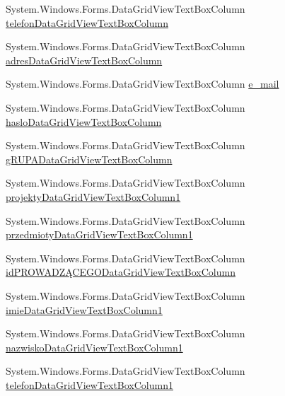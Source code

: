 \begin{DoxyCompactItemize}
\item 
System.\+Windows.\+Forms.\+Data\+Grid\+View\+Text\+Box\+Column \hyperlink{class_dziennik_ocen_1_1_form_admin_a72a251b150573a626647791876332015}{telefon\+Data\+Grid\+View\+Text\+Box\+Column}
\item 
System.\+Windows.\+Forms.\+Data\+Grid\+View\+Text\+Box\+Column \hyperlink{class_dziennik_ocen_1_1_form_admin_a06a64f75c8ce9a7c86ffdc6120741268}{adres\+Data\+Grid\+View\+Text\+Box\+Column}
\item 
System.\+Windows.\+Forms.\+Data\+Grid\+View\+Text\+Box\+Column \hyperlink{class_dziennik_ocen_1_1_form_admin_aaa3365a57ff352db1b165745e6631cb1}{e\+\_\+mail}
\item 
System.\+Windows.\+Forms.\+Data\+Grid\+View\+Text\+Box\+Column \hyperlink{class_dziennik_ocen_1_1_form_admin_a013f9ee1a23f86778e6c66155b1bf93e}{haslo\+Data\+Grid\+View\+Text\+Box\+Column}
\item 
System.\+Windows.\+Forms.\+Data\+Grid\+View\+Text\+Box\+Column \hyperlink{class_dziennik_ocen_1_1_form_admin_a6fc44af8dd2ad779199a11f1a2a3769d}{g\+R\+U\+P\+A\+Data\+Grid\+View\+Text\+Box\+Column}
\item 
System.\+Windows.\+Forms.\+Data\+Grid\+View\+Text\+Box\+Column \hyperlink{class_dziennik_ocen_1_1_form_admin_ac4aa25c3b282b8c8380d768559c95423}{projekty\+Data\+Grid\+View\+Text\+Box\+Column1}
\item 
System.\+Windows.\+Forms.\+Data\+Grid\+View\+Text\+Box\+Column \hyperlink{class_dziennik_ocen_1_1_form_admin_a227b182179159f912355b73406334336}{przedmioty\+Data\+Grid\+View\+Text\+Box\+Column1}
\item 
System.\+Windows.\+Forms.\+Data\+Grid\+View\+Text\+Box\+Column \hyperlink{class_dziennik_ocen_1_1_form_admin_a16d7e9e45a12e277f55ccfefedc4828e}{id\+P\+R\+O\+W\+A\+D\+ZĄ\+C\+E\+G\+O\+Data\+Grid\+View\+Text\+Box\+Column}
\item 
System.\+Windows.\+Forms.\+Data\+Grid\+View\+Text\+Box\+Column \hyperlink{class_dziennik_ocen_1_1_form_admin_a683c4a5df19d58a88cb375268f1f1216}{imie\+Data\+Grid\+View\+Text\+Box\+Column1}
\item 
System.\+Windows.\+Forms.\+Data\+Grid\+View\+Text\+Box\+Column \hyperlink{class_dziennik_ocen_1_1_form_admin_aa39a72b1739cdea4f0b46b03fcb35cd1}{nazwisko\+Data\+Grid\+View\+Text\+Box\+Column1}
\item 
System.\+Windows.\+Forms.\+Data\+Grid\+View\+Text\+Box\+Column \hyperlink{class_dziennik_ocen_1_1_form_admin_ade0d90058a355376268b3b0a4ae1444d}{telefon\+Data\+Grid\+View\+Text\+Box\+Column1}

\end{DoxyCompactItemize}
